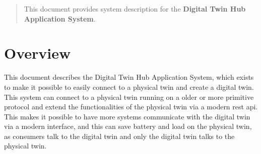 \documentclass[a4paper]{arrowhead}
\begin{document}
\ArrowheadDate{\today}
\ArrowheadSetup

\begin{center}
  \vspace*{1cm}
  \huge{\arrowtitle}

  \vspace*{0.2cm}
  \LARGE{\arrowtype}
  \vspace*{1cm}

  \vspace*{\fill}


  \vspace*{1cm}
  \vspace*{\fill}

  \begin{abstract}
    This document provides system description for the \textbf{Digital Twin Hub Application System}.
  \end{abstract}

  \vspace*{1cm}

 \end{center}

\newpage

\tableofcontents
\newpage

\section{Overview}
\label{sec:overview}
\color{black}
This document describes the Digital Twin Hub Application System, which exists to make it possible to easily connect to a physical twin and create a digital twin. This system can connect to a physical twin running on a older or more primitive protocol and extend the functionalities of the physical twin via a modern rest api. This makes it possible to have more systems communicate with the digital twin via a modern interface, and this can save battery and load on the physical twin, as consumers talk to the digital twin and only the digital twin talks to the physical twin. 
\end{document}
